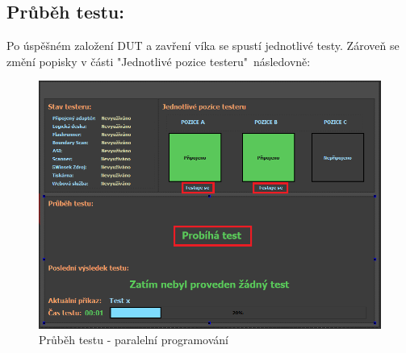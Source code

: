 \subsection{Průběh testu:}
Po úspěšném založení DUT a zavření víka se spustí jednotlivé testy. Zároveň se změní popisky v části "Jednotlivé pozice testeru"\ následovně:
	\begin{figure}[ht!]
		\centering
		\includegraphics[height = 0.35\textheight]{obrazky/dual_SCAN_TEST.PNG}
        \caption{Průběh testu - paralelní programování}
	\end{figure}


